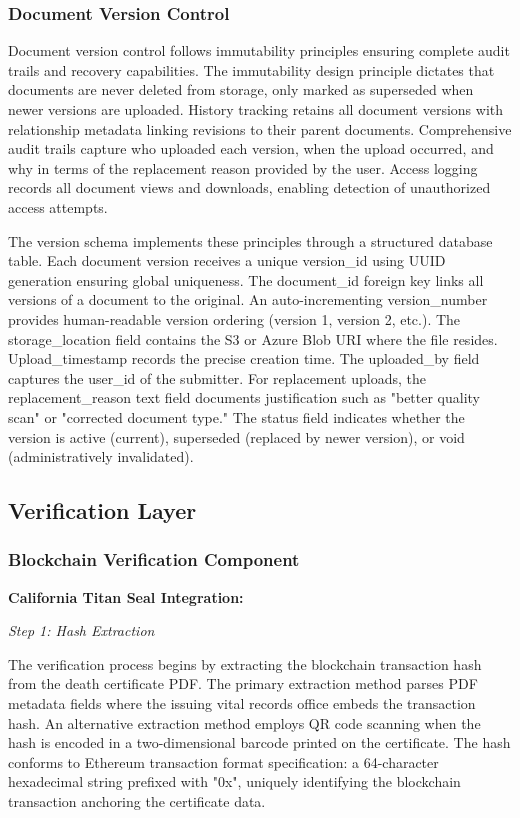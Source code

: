 \subsubsection{Document Version Control}

Document version control follows immutability principles ensuring complete audit trails and recovery capabilities. The immutability design principle dictates that documents are never deleted from storage, only marked as superseded when newer versions are uploaded. History tracking retains all document versions with relationship metadata linking revisions to their parent documents. Comprehensive audit trails capture who uploaded each version, when the upload occurred, and why in terms of the replacement reason provided by the user. Access logging records all document views and downloads, enabling detection of unauthorized access attempts.

The version schema implements these principles through a structured database table. Each document version receives a unique version\_id using UUID generation ensuring global uniqueness. The document\_id foreign key links all versions of a document to the original. An auto-incrementing version\_number provides human-readable version ordering (version 1, version 2, etc.). The storage\_location field contains the S3 or Azure Blob URI where the file resides. Upload\_timestamp records the precise creation time. The uploaded\_by field captures the user\_id of the submitter. For replacement uploads, the replacement\_reason text field documents justification such as "better quality scan" or "corrected document type." The status field indicates whether the version is active (current), superseded (replaced by newer version), or void (administratively invalidated).

\subsection{Verification Layer}

\subsubsection{Blockchain Verification Component}

\textbf{California Titan Seal Integration:}

\textit{Step 1: Hash Extraction}

The verification process begins by extracting the blockchain transaction hash from the death certificate PDF. The primary extraction method parses PDF metadata fields where the issuing vital records office embeds the transaction hash. An alternative extraction method employs QR code scanning when the hash is encoded in a two-dimensional barcode printed on the certificate. The hash conforms to Ethereum transaction format specification: a 64-character hexadecimal string prefixed with "0x", uniquely identifying the blockchain transaction anchoring the certificate data.

